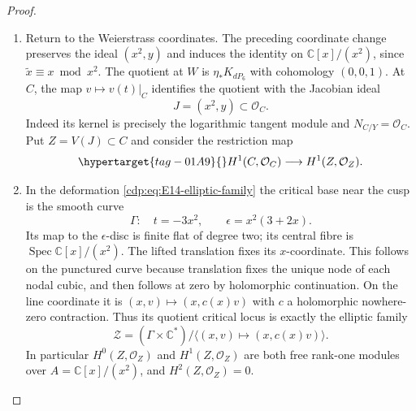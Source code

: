 \begin{proof}
\begin{enumerate}[label=\arabic*.,leftmargin=*]
\item Return to the Weierstrass coordinates. The preceding coordinate
change preserves the ideal $(x^2,y)$ and induces the identity on
$\mathbb C[x]/(x^2)$, since $\widetilde x\equiv x\bmod x^2$.
The quotient at $W$ is $\eta_*K_{dP_6}$ with cohomology $(0,0,1)$.
At $C$, the map $v\mapsto v(t)|_C$ identifies the quotient with
the Jacobian ideal
\[
 J=(x^2,y)\subset\mathcal O_C.
\]
Indeed its kernel is precisely the logarithmic tangent module and
$N_{C/Y}=\mathcal O_C$. Put $Z=V(J)\subset C$ and consider
the restriction map
\begin{equation}\hypertarget{tag-01A9}{}\label{cdp:eq:E14-jet-map}
 H^1(C,\mathcal O_C)\longrightarrow H^1(Z,\mathcal O_Z).
\end{equation}

\item In the deformation \eqref{cdp:eq:E14-elliptic-family} the critical
base near the cusp is the smooth curve
\[
 \Gamma:\quad t=-3x^2,\qquad
 \epsilon=x^2(3+2x).
\]
Its map to the $\epsilon$-disc is finite flat of degree two; its
central fibre is $\operatorname{Spec}\mathbb C[x]/(x^2)$.
The lifted translation fixes its $x$-coordinate. This follows on
the punctured curve because translation fixes the unique node of
each nodal cubic, and then follows at zero by holomorphic
continuation. On the line coordinate it is
$(x,v)\mapsto(x,c(x)v)$ with $c$ a holomorphic nowhere-zero
contraction. Thus its quotient critical locus is exactly the
elliptic family
\[
 \mathcal Z=(\Gamma\times\mathbb C^*)/
       \langle(x,v)\mapsto(x,c(x)v)\rangle.
\]
In particular $H^0(Z,\mathcal O_Z)$ and
$H^1(Z,\mathcal O_Z)$ are both free rank-one modules over
$A=\mathbb C[x]/(x^2)$, and $H^2(Z,\mathcal O_Z)=0$.


\end{enumerate}
\end{proof}
